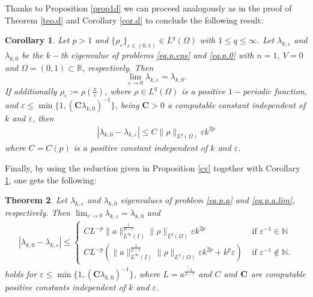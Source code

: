 \documentclass[12pt]{amsart}
\newtheorem{thm}{Theorem}[section]
\newtheorem{cor}[thm]{Corollary}
\theoremstyle{definition}
\theoremstyle{remark}
\numberwithin{equation}{section}
\begin{document}
Thanks to Proposition \ref{prop1d} we can proceed analogously as in the proof of Theorem \ref{teo.d} and Corollary \ref{cor.d} to conclude the following result:
\begin{cor} \label{cor.d.1}
Let $p> 1$ and $\{\rho_\varepsilon\}_{\varepsilon\in(0,1)} \in L^q(\Omega)$ with $1\leq q\leq \infty$. Let $\lambda_{k,\varepsilon}$ and $\lambda_{k,0}$ be the $k-$th eigenvalue of problems \eqref{eq.p.eps} and \eqref{eq.p.0} with $n=1$, $V=0$ and $\Omega=(0,1)\subset \mathbb R$,  respectively. Then
$$
\lim_{\varepsilon\to 0} \lambda_{k,\varepsilon} = \lambda_{k,0}.
$$
If additionally $\rho_\varepsilon:=\rho(\tfrac{x}{\varepsilon})$, where $\rho\in L^q(\Omega)$ is a positive  $1-$periodic function, and $\varepsilon \leq \min\{1,(\textbf{C} \lambda_{k,0})^{-1}\}$, being $\textbf{C}>0$  a computable constant independent of $k$ and $\varepsilon$, then
\begin{align*}
|\lambda_{k,0}-\lambda_{k,\varepsilon}| \leq C \|\rho\|_{L^q(\Omega)}\varepsilon  k^{2p}
\end{align*}
where $C = C (p)$ is a positive constant independent of $k$ and $\varepsilon$.
\end{cor}


Finally, by using the reduction given in Proposition \ref{cv} together with Corollary \ref{cor.d.1}, one gets the following:
\begin{thm} \label{teo.1d}
Let $\lambda_{k,\varepsilon}$ and $\lambda_{k,0}$ eigenvalues of problem \eqref{eq.p.a} and \eqref{eq.p.a.lim}, respectively. Then $\lim_{\varepsilon \to 0} \lambda_{k,\varepsilon}=\lambda_{k,0}$ and
\begin{align*}
|\lambda_{k,0}-\lambda_{k,\varepsilon}|\leq 
\begin{cases}
C L^{-p} \|a\|_{L^\infty(I)}^\frac{1}{p-1} \|\rho\|_{L^q(\Omega)}\varepsilon  k^{2p}  &\text{ if } \varepsilon^{-1}\in \mathbb N\\
C L^{-p} \left( \|a\|_{L^\infty(I)}^\frac{1}{p-1} \|\rho\|_{L^q(\Omega)}\varepsilon   k^{2p} +  k^p \varepsilon \right) &\text{ if } \varepsilon^{-1}\not \in \mathbb N.
\end{cases}
\end{align*}
holds for  $\varepsilon \leq \min\{ 1, (\textbf{C}\lambda_{k,0})^{-1}\}$, where $L=\overline{a^{\frac{-1}{p-1}}}$ and $C$ and  ${\bf C}$ are computable positive constants  independent of $k$ and $\varepsilon$.
\end{thm}
\end{document}
